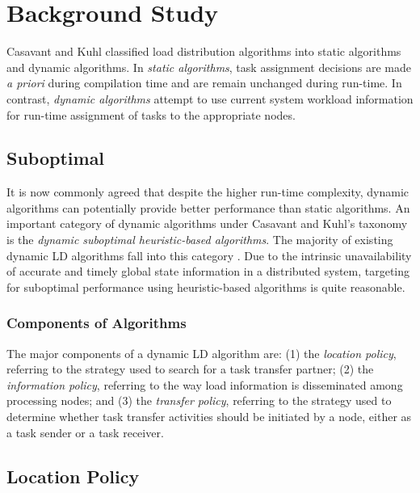 %

\chapter{Background Study}

%
Casavant and Kuhl \cite{casavant88} classified load distribution
algorithms into static algorithms and dynamic algorithms.
In {\it static algorithms\/}, task
assignment decisions are made {\it a priori\/} during compilation time and
are remain unchanged during run-time. In contrast, {\it dynamic algorithms\/}
attempt to use current system workload information for run-time assignment
of tasks to the appropriate nodes.


\section{Suboptimal}
%
It is now commonly agreed that despite the higher run-time complexity,
dynamic algorithms can potentially provide better performance than
static algorithms.
An important category of dynamic algorithms under
Casavant and Kuhl's taxonomy
is the {\it dynamic suboptimal heuristic-based algorithms\/}.
The majority of existing dynamic LD algorithms fall
into this category
\cite{eager86a,feng94,lu95b,lionel85,shiv90,shiv92,shiv95,wang85}.
Due to the intrinsic unavailability of accurate
and timely global state information in a distributed system,
targeting for suboptimal performance using heuristic-based
algorithms is quite reasonable.


\subsection{Components of Algorithms}
%
The major components of a dynamic LD algorithm are:
(1) the {\it location policy\/}, referring to the strategy used to
search for a task transfer partner;
(2) the {\it information policy}, referring to the way load
information is disseminated among processing nodes; and
(3) the {\it transfer policy\/}, referring to the strategy used to
determine whether task transfer activities should be initiated by a node,
either as a task sender or a task receiver.

\section{Location Policy}

